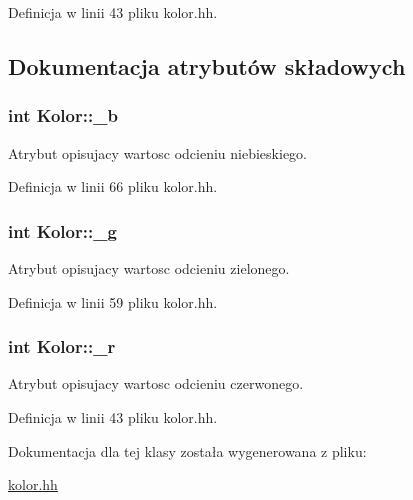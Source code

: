 Definicja w linii 43 pliku kolor.\-hh.



\subsection{Dokumentacja atrybutów składowych}
\hypertarget{class_kolor_a543b5984743ac9d471409c697382038b}{
\subsubsection[{\-\_\-b}]{\setlength{\rightskip}{0pt plus 5cm}int Kolor\-::\-\_\-b}}\label{class_kolor_a543b5984743ac9d471409c697382038b}
Atrybut opisujacy wartosc odcieniu niebieskiego. 

Definicja w linii 66 pliku kolor.\-hh.

\hypertarget{class_kolor_a568f73268d43f0e76c8ae75f0ef20229}{
\subsubsection[{\-\_\-g}]{\setlength{\rightskip}{0pt plus 5cm}int Kolor\-::\-\_\-g}}\label{class_kolor_a568f73268d43f0e76c8ae75f0ef20229}
Atrybut opisujacy wartosc odcieniu zielonego. 

Definicja w linii 59 pliku kolor.\-hh.

\hypertarget{class_kolor_ad887fb53be523b39fbead6a24671751e}{
\subsubsection[{\-\_\-r}]{\setlength{\rightskip}{0pt plus 5cm}int Kolor\-::\-\_\-r}}\label{class_kolor_ad887fb53be523b39fbead6a24671751e}
Atrybut opisujacy wartosc odcieniu czerwonego. 

Definicja w linii 43 pliku kolor.\-hh.



Dokumentacja dla tej klasy została wygenerowana z pliku\-:\begin{DoxyCompactItemize}
\item 
\hyperlink{kolor_8hh}{kolor.\-hh}\end{DoxyCompactItemize}
